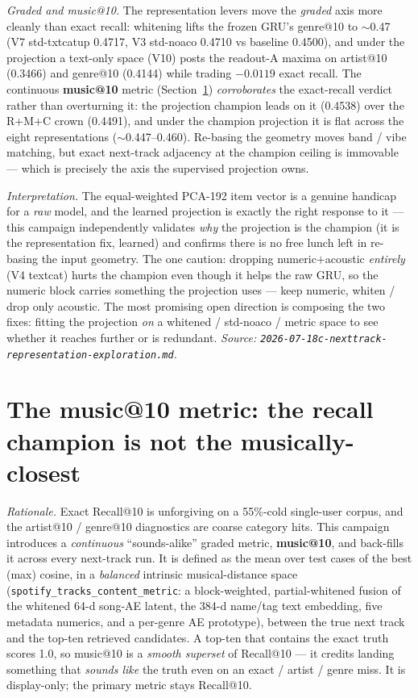 \documentclass[11pt]{article}
\newcommand{\dsid}[1]{\texttt{\small #1}}
\begin{document}
\emph{Graded and music@10.} The representation levers move the \emph{graded} axis
more cleanly than exact recall: whitening lifts the frozen GRU's genre@10 to
$\sim$\num{0.47} (V7 std-txtcatup \num{0.4717}, V3 std-noaco \num{0.4710} vs
baseline \num{0.4500}), and under the projection a text-only space (V10) posts the
readout-A maxima on artist@10 (\num{0.3466}) and genre@10 (\num{0.4144}) while
trading $-\num{0.0119}$ exact recall. The continuous \textbf{music@10} metric
(Section~\ref{sec:music}) \emph{corroborates} the exact-recall verdict rather than
overturning it: the projection champion leads on it (\num{0.4538}) over the R+M+C
crown (\num{0.4491}), and under the champion projection it is flat across the eight
representations ($\sim$\num{0.447}--\num{0.460}). Re-basing the geometry moves band
/ vibe matching, but exact next-track adjacency at the champion ceiling is
immovable --- which is precisely the axis the supervised projection owns.

\emph{Interpretation.} The equal-weighted PCA-192 item vector is a genuine
handicap for a \emph{raw} model, and the learned projection is exactly the right
response to it --- this campaign independently validates \emph{why} the projection
is the champion (it is the representation fix, learned) and confirms there is no
free lunch left in re-basing the input geometry. The one caution: dropping
numeric$+$acoustic \emph{entirely} (V4 textcat) hurts the champion even though it
helps the raw GRU, so the numeric block carries something the projection uses ---
keep numeric, whiten / drop only acoustic. The most promising open direction is
composing the two fixes: fitting the projection \emph{on} a whitened / std-noaco /
metric space to see whether it reaches further or is redundant.
\emph{Source: \texttt{2026-07-18c-nexttrack-representation-exploration.md}.}

\section{The music@10 metric: the recall champion is not the musically-closest}
\label{sec:music}
\emph{Rationale.} Exact Recall@10 is unforgiving on a 55\%-cold single-user corpus,
and the artist@10 / genre@10 diagnostics are coarse category hits. This campaign
introduces a \emph{continuous} ``sounds-alike'' graded metric, \textbf{music@10},
and back-fills it across every next-track run. It is defined as the mean over test
cases of the best (max) cosine, in a \emph{balanced} intrinsic musical-distance
space (\dsid{spotify\_tracks\_content\_metric}: a block-weighted, partial-whitened
fusion of the whitened 64-d song-AE latent, the 384-d name/tag text embedding, five
metadata numerics, and a per-genre AE prototype), between the true next track and
the top-ten retrieved candidates. A top-ten that contains the exact truth scores
\num{1.0}, so music@10 is a \emph{smooth superset} of Recall@10 --- it credits
landing something that \emph{sounds like} the truth even on an exact / artist /
genre miss. It is display-only; the primary metric stays Recall@10.
\end{document}
